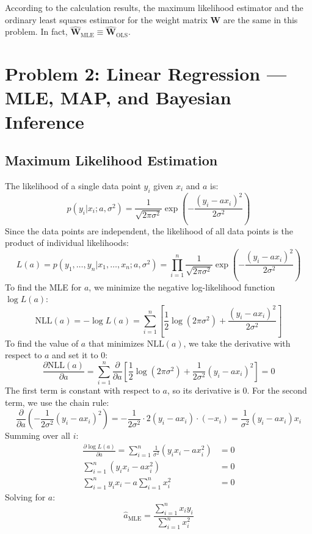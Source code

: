 \documentclass[11pt, a4paper, oneside]{memoir}
\begin{document}
According to the calculation results, the maximum likelihood estimator and the ordinary least squares estimator for the weight matrix $\mathbf{W}$ are the same in this problem. In fact, $\hat{\mathbf{W}}_{\text{MLE}} \equiv \hat{\mathbf{W}}_{\text{OLS}}$.

\chapter{Problem 2: Linear Regression — MLE, MAP, and Bayesian Inference}
\section{Maximum Likelihood Estimation}
The likelihood of a single data point $y_i$ given $x_i$ and $a$ is:
\[ p(y_i | x_i; a, \sigma^2) = \frac{1}{\sqrt{2\pi\sigma^2}} \exp\left( -\frac{(y_i - ax_i)^2}{2\sigma^2} \right) \]
Since the data points are independent, the likelihood of all data points is the product of individual likelihoods:
\[ L(a) = p(y_1, \dots, y_n | x_1, \dots, x_n; a, \sigma^2) = \prod_{i=1}^n \frac{1}{\sqrt{2\pi\sigma^2}} \exp\left( -\frac{(y_i - ax_i)^2}{2\sigma^2} \right) \]
To find the MLE for $a$, we minimize the negative log-likelihood function $\log L(a)$:
\[ \text{NLL}(a) = -\log L(a) = \sum_{i=1}^n \left[ \frac{1}{2} \log(2\pi\sigma^2) + \frac{(y_i - ax_i)^2}{2\sigma^2} \right] \]
To find the value of $a$ that minimizes $\text{NLL}(a)$, we take the derivative with respect to $a$ and set it to $0$:
\[ \frac{\partial \text{NLL}(a)}{\partial a} = \sum_{i=1}^n \frac{\partial}{\partial a} \left[ \frac{1}{2} \log(2\pi\sigma^2) + \frac{1}{2\sigma^2} (y_i - ax_i)^2 \right] = 0 \]
The first term is constant with respect to $a$, so its derivative is $0$. For the second term, we use the chain rule:
\[ \frac{\partial}{\partial a} \left( -\frac{1}{2\sigma^2} (y_i - ax_i)^2 \right) = -\frac{1}{2\sigma^2} \cdot 2(y_i - ax_i) \cdot (-x_i) = \frac{1}{\sigma^2} (y_i - ax_i)x_i \]
Summing over all $i$:
\begin{align*}
    \frac{\partial \log L(a)}{\partial a} = \sum_{i=1}^n \frac{1}{\sigma^2} (y_i x_i - ax_i^2) & = 0 \\
    \sum_{i=1}^n (y_i x_i - ax_i^2)                                                            & = 0 \\
    \sum_{i=1}^n y_i x_i - a \sum_{i=1}^n x_i^2                                                & = 0
\end{align*}
Solving for $a$:
\[ \hat{a}_{\text{MLE}} = \frac{\sum_{i=1}^n x_i y_i}{\sum_{i=1}^n x_i^2} \]
\end{document}
